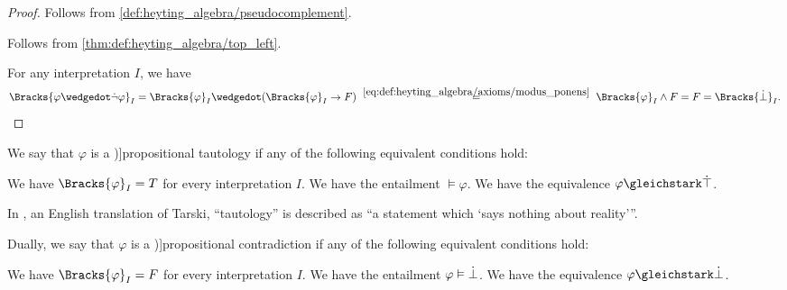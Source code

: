 \begin{proof}
   Follows from \cref{def:heyting_algebra/pseudocomplement}.

   Follows from \cref{thm:def:heyting_algebra/top_left}.

   For any interpretation \( I \), we have
  \begin{equation*}
    \Bracks{ \varphi \synwedge \synneg \varphi }_I
    =
    \Bracks{ \varphi }_I \synwedge (\Bracks{ \varphi }_I \rightarrow F)
    \reloset {\eqref{eq:def:heyting_algebra/axioms/modus_ponens}} =
    \Bracks{ \varphi }_I \wedge F
    =
    F
    =
    \Bracks{\synbot}_I.
  \end{equation*}
\end{proof}

\begin{definition}\label{def:propositional_tautology}
  We say that \( \varphi \) is a \term[ru=пропозициональная тавтология (\cite[44]{КолмогоровДрагалин2006Логика})]{propositional tautology} if any of the following equivalent conditions hold:
  \begin{thmenum}
     We have \( \Bracks{\varphi}_I = T \) for every interpretation \( I \).
     We have the entailment \( \vDash \varphi \).
     We have the equivalence \( \varphi \gleichstark \syntop \).
  \end{thmenum}
\end{definition}
\begin{comments}
  \item In \cite[419]{Tarski1983LogicalConsequence}, an English translation of Tarski, \enquote{tautology} is described as \enquote{a statement which \enquote*{says nothing about reality}}.
\end{comments}

\begin{definition}\label{def:propositional_contradiction}
  Dually, we say that \( \varphi \) is a \term[en=contradictory (formula) (\cite[28]{Kleene2002Logic})]{propositional contradiction} if any of the following equivalent conditions hold:
  \begin{thmenum}
     We have \( \Bracks{\varphi}_I = F \) for every interpretation \( I \).
     We have the entailment \( \varphi \vDash \dot{\bot} \).
     We have the equivalence \( \varphi \gleichstark \synbot \).
  \end{thmenum}
\end{definition}


